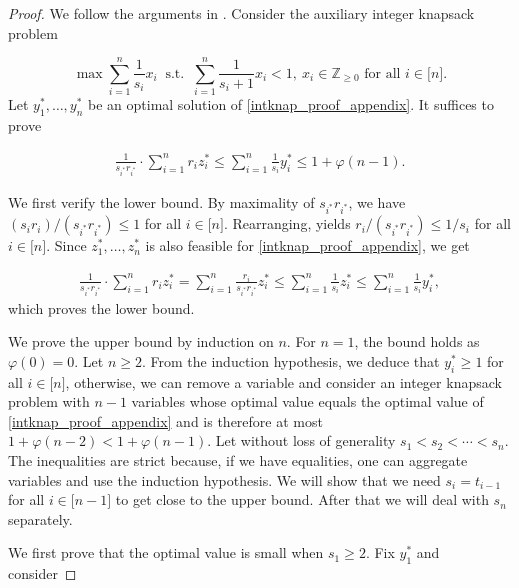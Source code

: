 \documentclass[pdflatex]{sn-jnl}
\newcommand{\Z}{\mathbb{Z}}
\theoremstyle{thmstyleone}%
\theoremstyle{thmstyletwo}%
\theoremstyle{thmstylethree}%
\begin{document}
	\begin{proof}
		We follow the arguments in \cite{kohlikrishna1992greedyknapsack}. 
		Consider the auxiliary integer knapsack problem
		
		\begin{equation}\label{intknap_proof_appendix}
			\max \sum_{i=1}^n\frac{1}{s_i}x_i \ \text{ s.t. } \ \sum_{i = 1}^n \frac{1}{s_i + 1}x_i < 1, \ x_i\in\Z_{\geq 0} \text{ for all }i\in \lbrack n\rbrack.
		\end{equation}
		Let $y^*_1,\ldots,y_n^*$ be an optimal solution of \eqref{intknap_proof_appendix}. It suffices to prove 
		
		\begin{align*}
			\frac{1}{s_{i^*}r_{i^*}}\cdot\sum_{i=1}^n r_iz^*_i \leq \sum_{i=1}^n \frac{1}{s_i}y^*_i \leq 1 + \varphi(n-1).
		\end{align*}
		
		We first verify the lower bound. By maximality of $s_{i^*}r_{i^*}$, we have $(s_{i}r_{i})/(s_{i^*}r_{i^*})\leq 1$ for all $i\in\lbrack n\rbrack$. Rearranging, yields $r_{i}/(s_{i^*}r_{i^*}) \leq 1/s_i$ for all $i\in\lbrack n\rbrack$. Since $z_1^*,\ldots,z_n^*$ is also feasible for \eqref{intknap_proof_appendix}, we get
		
		\begin{align*}
			\frac{1}{s_{i^*}r_{i^*}}\cdot\sum_{i=1}^n r_iz^*_i = \sum_{i=1}^n \frac{r_i}{s_{i^*}r_{i^*}}z^*_i \leq \sum_{i=1}^n \frac{1}{s_i}z^*_i\leq \sum_{i=1}^n \frac{1}{s_i}y^*_i,
		\end{align*}
		which proves the lower bound.
		
		We prove the upper bound by induction on $n$. For $n=1$, the bound holds as $\varphi(0) = 0$. Let $n \geq 2$. From the induction hypothesis, we deduce that $y^*_i\geq 1$ for all $i\in\lbrack n\rbrack$, otherwise, we can remove a variable and consider an integer knapsack problem with $n-1$ variables whose optimal value equals the optimal value of \eqref{intknap_proof_appendix} and is therefore at most $1 + \varphi(n-2) < 1 + \varphi(n-1)$. Let without loss of generality $s_1 < s_2 < \cdots < s_n$. The inequalities are strict because, if we have equalities, one can aggregate variables and use the induction hypothesis. We will show that we need $s_i = t_{i-1}$ for all $i\in\lbrack n-1\rbrack$ to get close to the upper bound. After that we will deal with $s_n$ separately. 
		
		We first prove that the optimal value is small when $s_1 \geq 2$. Fix $y_1^*$ and consider 
		

\end{proof}
\end{document}
